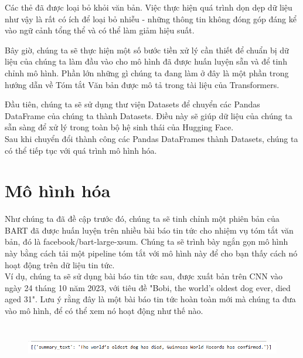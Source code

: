 Các thẻ đã được loại bỏ khỏi văn bản. Việc thực hiện quá trình dọn dẹp dữ liệu như vậy là rất có ích để loại bỏ nhiễu - những thông tin không đóng góp đáng kể vào ngữ cảnh tổng thể và có thể làm giảm hiệu suất.

Bây giờ, chúng ta sẽ thực hiện một số bước tiền xử lý cần thiết để chuẩn bị dữ liệu của chúng ta làm đầu vào cho mô hình đã được huấn luyện sẵn và để tinh chỉnh mô hình. Phần lớn những gì chúng ta đang làm ở đây là một phần trong hướng dẫn về Tóm tắt Văn bản được mô tả trong tài liệu của Transformers.

Đầu tiên, chúng ta sẽ sử dụng thư viện Datasets để chuyển các Pandas DataFrame của chúng ta thành Datasets. Điều này sẽ giúp dữ liệu của chúng ta sẵn sàng để xử lý trong toàn bộ hệ sinh thái của Hugging Face.\\



Sau khi chuyển đổi thành công các Pandas DataFrames thành Datasets, chúng ta có thể tiếp tục với quá trình mô hình hóa.\\

\section{Mô hình hóa}
Như chúng ta đã đề cập trước đó, chúng ta sẽ tinh chỉnh một phiên bản của BART đã được huấn luyện trên nhiều bài báo tin tức cho nhiệm vụ tóm tắt văn bản, đó là facebook/bart-large-xsum.
Chúng ta sẽ trình bày ngắn gọn mô hình này bằng cách tải một pipeline tóm tắt với mô hình này để cho bạn thấy cách nó hoạt động trên dữ liệu tin tức.\\



Ví dụ, chúng ta sẽ sử dụng bài báo tin tức sau, được xuất bản trên CNN vào ngày 24 tháng 10 năm 2023, với tiêu đề "Bobi, the world's oldest dog ever, died aged 31". Lưu ý rằng đây là một bài báo tin tức hoàn toàn mới mà chúng ta đưa vào mô hình, để có thể xem nó hoạt động như thế nào.\\




\begin{figure}[htp]
	\centering
	\includegraphics[width=16cm, height=2cm]{images/kq}

\end{figure}

